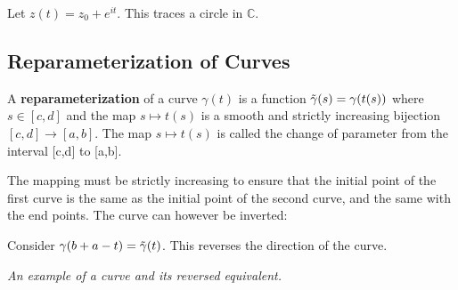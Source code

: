 \begin{example}
Let $z(t) = z_0+e^{it}$. This traces a circle in $\mathbb{C}$.
\end{example}

\subsection{Reparameterization of Curves}

\begin{definition}[Reparameterization]
A \textbf{reparameterization} of a curve $\gamma(t)$ is a function $\Tilde{\gamma}(s) = \gamma(t(s))$ where $s\in[c,d]$ and the map  $s \mapsto t(s)$ is a smooth and strictly increasing bijection $[c,d] \rightarrow [a,b]$. The map $s \mapsto t(s)$ is called the change of parameter from the interval [c,d] to [a,b]. 
\end{definition}

\begin{note}
The mapping must be strictly increasing to ensure that the initial point of the first curve is the same as the initial point of the second curve, and the same with the end points. The curve can however be inverted:
\end{note}

\begin{example}
Consider $\gamma(b+a-t) = \Tilde{\gamma}(t)$. This reverses the direction of the curve.
\end{example}


\begin{center}


\textit{An example of a curve and its reversed equivalent.}
\end{center}


